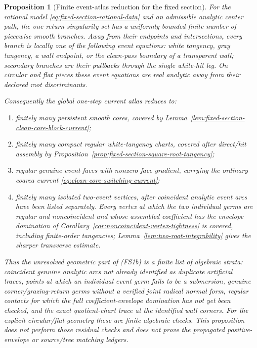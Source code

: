 \documentclass[11pt]{article}
\newtheorem{proposition}[theorem]{Proposition}
\begin{document}
\begin{proposition}[Finite event-atlas reduction for the fixed section]
\label{prop:fixed-section-finite-event-atlas}
For the rational model \eqref{eq:fixed-section-rational-data} and an
admissible analytic center path, the one-return singularity set has a
uniformly bounded finite number of piecewise smooth branches.  Away from
their endpoints and intersections, every branch is locally one of the
following event equations: white tangency, gray tangency, a wall endpoint,
or the clean-pass boundary of a transparent wall; secondary branches are
their pullbacks through the single white-hit leg.  On circular and flat
pieces these event equations are real analytic away from their declared
root discriminants.

Consequently the global one-step current atlas reduces to:
\begin{enumerate}[label=\textup{(FA\arabic*)}]
\item finitely many persistent smooth cores, covered by
Lemma~\ref{lem:fixed-section-clean-core-block-current};
\item finitely many compact regular white-tangency charts, covered after
direct/hit assembly by
Proposition~\ref{prop:fixed-section-square-root-tangency};
\item regular genuine event faces with nonzero face gradient, carrying the
ordinary coarea current \eqref{eq:clean-core-switching-current};
\item finitely many isolated two-event vertices, after coincident analytic
event arcs have been listed separately.  Every vertex at which the two
individual germs are regular and noncoincident and whose assembled
coefficient has the envelope domination of
Corollary~\ref{cor:noncoincident-vertex-tightness} is covered, including
finite-order tangencies; Lemma~\ref{lem:two-root-integrability} gives the
sharper transverse estimate.
\end{enumerate}
Thus the unresolved geometric part of \textup{(FS1b)} is a finite list of
algebraic strata: coincident genuine analytic arcs not already identified
as duplicate artificial traces, points at which an individual event germ
fails to be a submersion, genuine corner/grazing-return germs without a
verified joint radical normal form, regular contacts for which the full
coefficient-envelope domination has not yet been checked, and the exact
quotient-chart trace at
the identified wall corners.  For the explicit circular/flat geometry these
are finite algebraic checks.  This proposition does not perform those
residual checks and does not prove the
propagated positive-envelope or source/tree matching ledgers.
\end{proposition}
\end{document}

